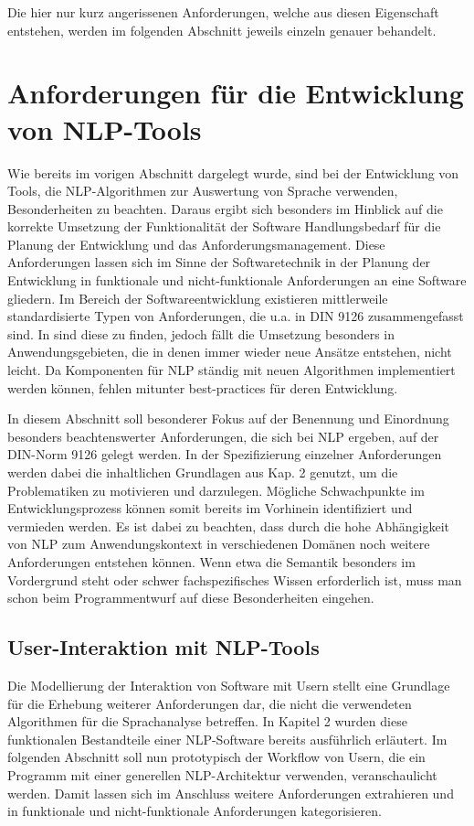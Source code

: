 \documentclass[12pt]{report}
\begin{document}
Die hier nur kurz angerissenen Anforderungen, welche aus diesen Eigenschaft entstehen, werden im folgenden Abschnitt jeweils einzeln genauer behandelt.

\section[Anforderungen an NLP-Tools]{Anforderungen für die Entwicklung von NLP-Tools}
Wie bereits im vorigen Abschnitt dargelegt wurde, sind bei der Entwicklung von Tools, die NLP-Algorithmen zur Auswertung von Sprache verwenden, Besonderheiten zu beachten. Daraus ergibt sich besonders im Hinblick auf die korrekte Umsetzung der Funktionalität der Software Handlungsbedarf für die Planung der Entwicklung und das Anforderungsmanagement. Diese Anforderungen lassen sich im Sinne der Softwaretechnik in der Planung der Entwicklung in funktionale und nicht-funktionale Anforderungen an eine Software gliedern. Im Bereich der Softwareentwicklung existieren mittlerweile standardisierte Typen von Anforderungen, die u.a. in DIN 9126 zusammengefasst sind. In \cite{bal98} sind diese zu finden, jedoch fällt die Umsetzung besonders in Anwendungsgebieten, die in denen immer wieder neue Ansätze entstehen, nicht leicht. Da Komponenten für NLP ständig mit neuen Algorithmen implementiert werden können, fehlen mitunter best-practices für deren Entwicklung.

In diesem Abschnitt soll besonderer Fokus auf der Benennung und Einordnung besonders beachtenswerter Anforderungen, die sich bei NLP ergeben, auf der DIN-Norm 9126 gelegt werden. In der Spezifizierung einzelner Anforderungen werden dabei die inhaltlichen Grundlagen aus Kap. 2 genutzt, um die Problematiken zu motivieren und darzulegen. Mögliche Schwachpunkte im Entwicklungsprozess können somit bereits im Vorhinein identifiziert und vermieden werden. Es ist dabei zu beachten, dass durch die hohe Abhängigkeit von NLP zum Anwendungskontext in verschiedenen Domänen noch weitere Anforderungen entstehen können. Wenn etwa die Semantik besonders im Vordergrund steht oder schwer fachspezifisches Wissen erforderlich ist, muss man schon beim Programmentwurf auf diese Besonderheiten eingehen.

\subsection{User-Interaktion mit NLP-Tools}
Die Modellierung der Interaktion von Software mit Usern stellt eine Grundlage für die Erhebung weiterer Anforderungen dar, die nicht die verwendeten Algorithmen für die Sprachanalyse betreffen. In Kapitel 2 wurden diese funktionalen Bestandteile einer NLP-Software  bereits ausführlich erläutert.
Im folgenden Abschnitt soll nun prototypisch der Workflow von Usern, die ein Programm mit einer generellen NLP-Architektur verwenden, veranschaulicht werden. Damit lassen sich im Anschluss weitere Anforderungen extrahieren und in funktionale und nicht-funktionale Anforderungen kategorisieren.
\end{document}
